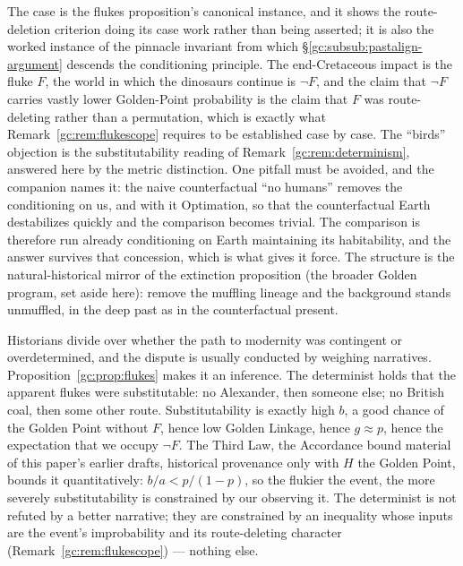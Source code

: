 The case is the flukes proposition's canonical instance, and it
shows the route-deletion criterion doing its case work rather than
being asserted; it is also the worked instance of the pinnacle
invariant from which \S\ref{gc:subsub:pastalign-argument} descends
the conditioning principle. The end-Cretaceous impact is the fluke $F$, the
world in which the dinosaurs continue is $\neg F$, and the claim
that $\neg F$ carries vastly lower Golden-Point probability is the
claim that $F$ was route-deleting rather than a permutation, which
is exactly what Remark~\ref{gc:rem:flukescope} requires to be
established case by case. The ``birds'' objection is the
substitutability reading of Remark~\ref{gc:rem:determinism},
answered here by the metric distinction. One pitfall must be
avoided, and the companion names it: the naive counterfactual ``no
humans'' removes the conditioning on us, and with it Optimation, so
that the counterfactual Earth destabilizes quickly and the
comparison becomes trivial. The comparison is therefore run already
conditioning on Earth maintaining its habitability, and the answer
survives that concession, which is what gives it force. The
structure is the natural-historical mirror of the extinction
proposition (the broader Golden program, set aside here): remove the muffling lineage
and the background stands unmuffled, in the deep past as in the
counterfactual present.


\begin{remark}\label{gc:rem:determinism}
Historians divide over whether the path to modernity was contingent or
overdetermined, and the dispute is usually conducted by weighing
narratives. Proposition~\ref{gc:prop:flukes} makes it an inference. The determinist holds that the apparent flukes were substitutable: no
Alexander, then someone else; no British coal, then some other route.
Substitutability is exactly high $b$, a good chance of the Golden
Point without $F$, hence low Golden Linkage, hence $g \approx p$,
hence the expectation that we occupy $\neg F$. The Third Law, the
Accordance bound material of this paper's earlier drafts, historical provenance only with $H$ the Golden Point, bounds it quantitatively: $b/a < p/(1-p)$, so the flukier the event, the more
severely substitutability is constrained by our observing it. The
determinist is not refuted by a better narrative; they are constrained
by an inequality whose inputs are the event's improbability and its
route-deleting character (Remark~\ref{gc:rem:flukescope}) --- nothing
else.
\end{remark}

